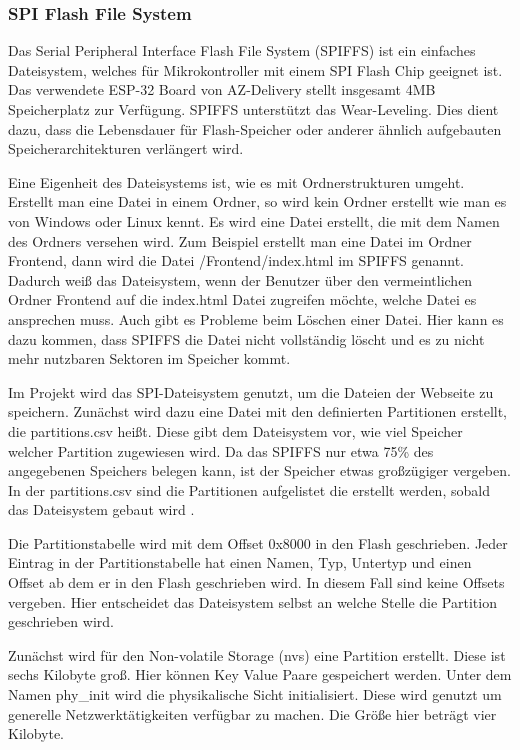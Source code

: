 \subsubsection{SPI Flash File System}
Das Serial Peripheral Interface Flash File System (SPIFFS) ist ein einfaches Dateisystem, welches für Mikrokontroller mit einem SPI Flash Chip geeignet ist. Das verwendete ESP-32 Board von AZ-Delivery stellt insgesamt 4MB Speicherplatz zur Verfügung.
SPIFFS unterstützt das Wear-Leveling. Dies dient dazu, dass die Lebensdauer für Flash-Speicher oder anderer ähnlich aufgebauten Speicherarchitekturen verlängert wird.

Eine Eigenheit des Dateisystems ist, wie es mit Ordnerstrukturen umgeht. Erstellt man eine Datei in einem Ordner, so wird kein Ordner erstellt wie man es von Windows oder Linux kennt. Es wird eine Datei erstellt, die mit dem Namen des Ordners versehen wird.
Zum Beispiel erstellt man eine Datei im Ordner Frontend, dann wird die Datei \glqq /Frontend/index.html\grqq{} im SPIFFS genannt.
Dadurch weiß das Dateisystem, wenn der Benutzer über den vermeintlichen Ordner Frontend auf die index.html Datei zugreifen möchte, welche Datei es ansprechen muss.
Auch gibt es Probleme beim Löschen einer Datei. Hier kann es dazu kommen, dass SPIFFS die Datei nicht vollständig löscht und es zu nicht mehr nutzbaren Sektoren im Speicher kommt.

Im Projekt wird das SPI-Dateisystem genutzt, um die Dateien der Webseite zu speichern. Zunächst wird dazu eine Datei mit den definierten Partitionen erstellt, die \glqq partitions.csv\grqq{} heißt. Diese gibt dem Dateisystem vor, wie viel Speicher welcher Partition zugewiesen wird.
Da das SPIFFS nur etwa 75\% des angegebenen Speichers belegen kann, ist der Speicher etwas großzügiger vergeben. In der \glqq partitions.csv\grqq{} sind die Partitionen aufgelistet die erstellt werden, sobald das Dateisystem gebaut wird \autocite{espidf:SPIFFS}.

Die Partitionstabelle wird mit dem Offset 0x8000 in den Flash geschrieben. Jeder Eintrag in der Partitionstabelle hat einen Namen, Typ, Untertyp und einen Offset ab dem er in den Flash geschrieben wird.
In diesem Fall sind keine Offsets vergeben. Hier entscheidet das Dateisystem selbst an welche Stelle die Partition geschrieben wird.

Zunächst wird für den Non-volatile Storage (nvs) eine Partition erstellt. Diese ist sechs Kilobyte groß. Hier können Key Value Paare gespeichert werden.
Unter dem Namen \glqq phy\_init\grqq{} wird die physikalische Sicht initialisiert. Diese wird genutzt um generelle Netzwerktätigkeiten verfügbar zu machen. Die Größe hier beträgt vier Kilobyte.

